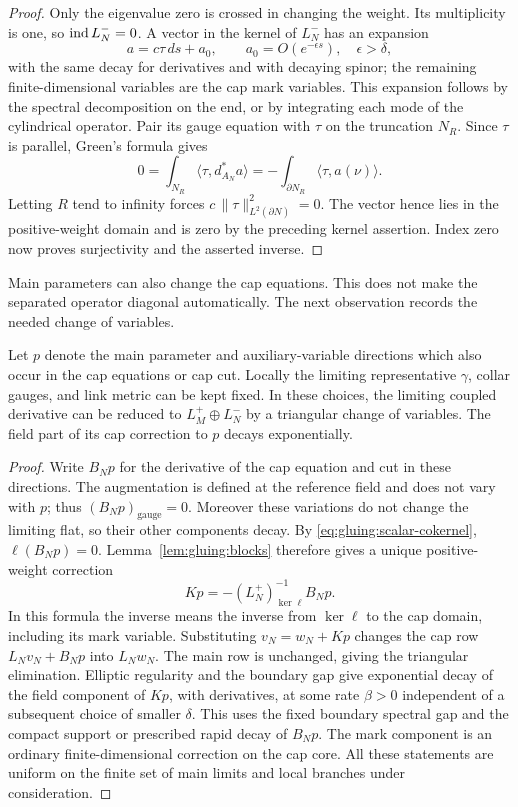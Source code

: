 \begin{proof}
Only the eigenvalue zero is crossed in changing the weight.  Its
multiplicity is one, so $\operatorname{ind} L_N^-=0$.  A vector in the kernel of
$L_N^-$ has an expansion
\[
 a=c\tau\,ds+a_0,\qquad a_0=O(e^{-\epsilon s}),\quad\epsilon>\delta,
\]
with the same decay for derivatives and with decaying spinor; the
remaining finite-dimensional variables are the cap mark variables.
This expansion follows by the spectral decomposition on the end,
or by integrating each mode of the cylindrical operator.  Pair its
gauge equation with $\tau$ on the truncation $N_R$.  Since $\tau$ is
parallel, Green's formula gives
\[
 0=\int_{N_R}\langle\tau,d_{A_N}^*a\rangle
   =-\int_{\partial N_R}\langle\tau,a(\nu)\rangle.
\]
Letting $R$ tend to infinity forces
$c\,\|\tau\|_{L^2(\partial N)}^2=0$.  The vector hence lies in the
positive-weight domain and is zero by the preceding kernel assertion.
Index zero now proves surjectivity and the asserted inverse.
\end{proof}

Main parameters can also change the cap equations.  This does not
make the separated operator diagonal automatically.  The next
observation records the needed change of variables.

\begin{lemma}
\label{lem:gluing:triangular}
Let $p$ denote the main parameter and auxiliary-variable directions
which also occur in the cap equations or cap cut.  Locally the
limiting representative $\gamma$, collar gauges, and link metric
can be kept fixed.  In these choices, the limiting coupled derivative
can be reduced to $L_M^+\oplus L_N^-$ by a triangular change of variables.
The field part of its cap correction to $p$ decays exponentially.
\end{lemma}

\begin{proof}
Write $B_Np$ for the derivative of the cap equation and cut in these
directions.  The augmentation is defined at the reference field
and does not vary with $p$; thus $(B_Np)_{\mathrm{gauge}}=0$.
Moreover these variations do not change the limiting flat, so their
other components decay.  By \eqref{eq:gluing:scalar-cokernel},
$\ell(B_Np)=0$.  Lemma~\ref{lem:gluing:blocks} therefore gives a unique
positive-weight correction
\begin{equation}
 Kp=-(L_N^+)^{-1}_{\ker\ell}B_Np.
 \label{eq:gluing:parameter-correction}
\end{equation}
In this formula the inverse means the inverse from $\ker\ell$ to
the cap domain, including its mark variable.
Substituting $v_N=w_N+Kp$ changes the cap row
$L_Nv_N+B_Np$ into $L_Nw_N$.  The main row is unchanged, giving
the triangular elimination.  Elliptic regularity and the boundary
gap give exponential decay of the field component of $Kp$, with
derivatives, at some rate $\beta>0$ independent of a subsequent
choice of smaller $\delta$.  This uses the fixed boundary spectral
gap and the compact support or prescribed rapid decay of $B_Np$.
The mark component is an ordinary finite-dimensional correction
on the cap core.  All these
statements are uniform on the finite set of main limits and local
branches under consideration.
\end{proof}

